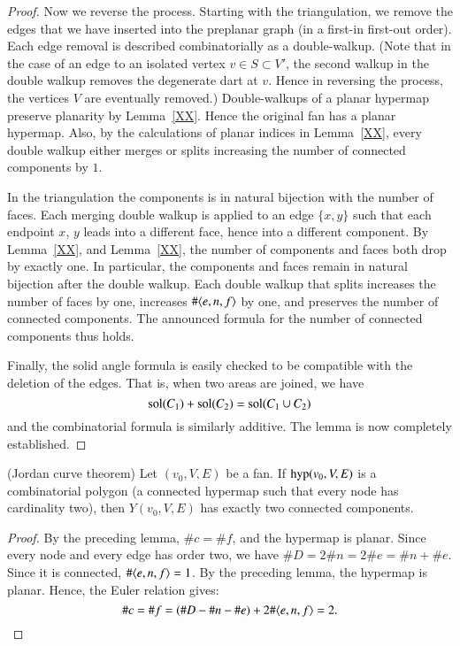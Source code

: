 \begin{proof}
Now we reverse the process.  Starting with the triangulation, we remove the
edges that we have inserted into the preplanar graph  (in a first-in first-out order).  
Each edge removal is
described combinatorially as a double-walkup.  (Note that
in the case of an edge to an isolated vertex  $v\in S\subset V'$, the second walkup
in the double walkup
 removes the degenerate dart at $v$.  Hence in reversing the process,
the vertices $V$ are eventually removed.)  Double-walkups of
a planar hypermap preserve planarity by Lemma~\ref{XX}.  Hence the original
fan has a planar hypermap.  Also, by the calculations of planar indices
in Lemma~\ref{XX}, every double walkup either merges or  splits
 increasing the number of connected components by $1$.

In the triangulation the components is in natural bijection with the number of faces.
Each merging double walkup is applied to an edge $\{x,y\}$ such that each endpoint $x$,
$y$ leads into a different face, hence into a different component.  By Lemma~\ref{XX},
and Lemma~\ref{XX}, the number of components and faces both drop by exactly one.
In particular, the components and faces remain in natural bijection after the
double walkup.  Each double walkup that splits increases the number of faces by one,
increases $\#\langle e,n,f\rangle$ by one, and preserves the number of connected components.
The announced formula for the number of connected components thus holds.

Finally, the solid angle formula is easily checked to be compatible with
the deletion of the edges.  That is, when two areas are joined, we have
  $${\operatorname{sol}}(C_1) + {\operatorname{sol}}(C_2) = {\operatorname{sol}}(C_1\cup C_2)$$
and the combinatorial formula is similarly additive.
The lemma is now completely established.
\end{proof}



\begin{lemma} (Jordan curve theorem)  Let $(v_0,V,E)$ be a fan.
If ${\operatorname{hyp}}(v_0,V,E)$ is a combinatorial polygon (a
connected hypermap such that every node has cardinality two), then
$Y(v_0,V,E)$ has exactly two connected components.
\end{lemma}

\begin{proof} By the preceding lemma, $\# c = \#f$, and the
hypermap is planar.  Since every node and every edge has order two,
we have $\#D = 2\#n = 2\# e = \#n +\#e$.  Since it is connected,
$\#\langle e,n,f\rangle = 1$.  By the preceding lemma, the hypermap is
planar. Hence, the Euler relation gives:
    $$
    \#c = \#f = (\#D - \#n - \#e) + 2\#\langle e,n,f\rangle =2.
    $$
\end{proof}


